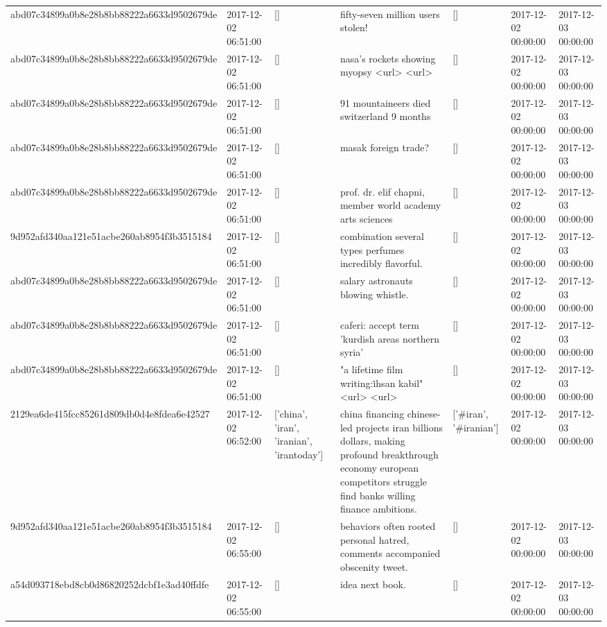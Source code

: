 \begin{tabular}{lllllll}
abd07c34899a0b8e28b8bb88222a6633d9502679de & 2017-12-02 06:51:00 & [] & fifty-seven million users stolen! & [] & 2017-12-02 00:00:00 & 2017-12-03 00:00:00 \\
abd07c34899a0b8e28b8bb88222a6633d9502679de & 2017-12-02 06:51:00 & [] & nasa's rockets showing myopsy <url> <url> & [] & 2017-12-02 00:00:00 & 2017-12-03 00:00:00 \\
abd07c34899a0b8e28b8bb88222a6633d9502679de & 2017-12-02 06:51:00 & [] & 91 mountaineers died switzerland 9 months & [] & 2017-12-02 00:00:00 & 2017-12-03 00:00:00 \\
abd07c34899a0b8e28b8bb88222a6633d9502679de & 2017-12-02 06:51:00 & [] & masak foreign trade? & [] & 2017-12-02 00:00:00 & 2017-12-03 00:00:00 \\
abd07c34899a0b8e28b8bb88222a6633d9502679de & 2017-12-02 06:51:00 & [] & prof. dr. elif chapni, member world academy arts sciences & [] & 2017-12-02 00:00:00 & 2017-12-03 00:00:00 \\
9d952afd340aa121e51acbe260ab8954f3b3515184 & 2017-12-02 06:51:00 & [] & combination several types perfumes incredibly flavorful. & [] & 2017-12-02 00:00:00 & 2017-12-03 00:00:00 \\
abd07c34899a0b8e28b8bb88222a6633d9502679de & 2017-12-02 06:51:00 & [] & salary astronauts blowing whistle. & [] & 2017-12-02 00:00:00 & 2017-12-03 00:00:00 \\
abd07c34899a0b8e28b8bb88222a6633d9502679de & 2017-12-02 06:51:00 & [] & caferi: accept term 'kurdish areas northern syria' & [] & 2017-12-02 00:00:00 & 2017-12-03 00:00:00 \\
abd07c34899a0b8e28b8bb88222a6633d9502679de & 2017-12-02 06:51:00 & [] & "a lifetime film writing:i̇hsan kabil" <url> <url> & [] & 2017-12-02 00:00:00 & 2017-12-03 00:00:00 \\
2129ea6de415fcc85261d809db0d4e8fdea6e42527 & 2017-12-02 06:52:00 & ['china', 'iran', 'iranian', 'irantoday'] & china financing chinese-led projects iran billions dollars, making profound breakthrough economy european competitors struggle find banks willing finance ambitions. & ['#iran', '#iranian'] & 2017-12-02 00:00:00 & 2017-12-03 00:00:00 \\
9d952afd340aa121e51acbe260ab8954f3b3515184 & 2017-12-02 06:55:00 & [] & behaviors often rooted personal hatred, comments accompanied obscenity tweet. & [] & 2017-12-02 00:00:00 & 2017-12-03 00:00:00 \\
a54d093718ebd8cb0d86820252dcbf1e3ad40ffdfe & 2017-12-02 06:55:00 & [] & idea next book. & [] & 2017-12-02 00:00:00 & 2017-12-03 00:00:00 \\

\end{tabular}
